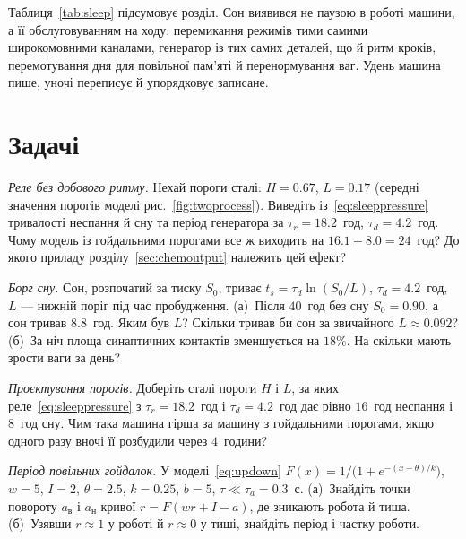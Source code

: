 Таблиця~\ref{tab:sleep} підсумовує розділ. Сон виявився не паузою в роботі машини, а її обслуговуванням на ходу: перемикання режимів тими самими широкомовними каналами, генератор із тих самих деталей, що й ритм кроків, перемотування дня для повільної пам'яті й перенормування ваг. Удень машина пише, уночі переписує й упорядковує записане.

\section{Задачі}

\begin{exercise}[\lvlA]
\label{ex:20:1}
\emph{Реле без добового ритму.} Нехай пороги сталі: $H=0.67$, $L=0.17$ (середні значення порогів моделі рис.~\ref{fig:twoprocess}). Виведіть із~\eqref{eq:sleeppressure} тривалості неспання й сну та період генератора за $\tau_r=18.2$~год, $\tau_d=4.2$~год. Чому модель із гойдальними порогами все ж виходить на $16.1+8.0=24$~год? До якого приладу розділу~\ref{sec:chemoutput} належить цей ефект?
\end{exercise}

\begin{exercise}[\lvlA]
\label{ex:20:2}
\emph{Борг сну.} Сон, розпочатий за тиску $S_0$, триває $t_s=\tau_d\ln(S_0/L)$, $\tau_d=4.2$~год, $L$ --- нижній поріг під час пробудження. (а)~Після $40$~год без сну $S_0=0.90$, а сон тривав $8.8$~год. Яким був $L$? Скільки тривав би сон за звичайного $L\approx0.092$? (б)~За ніч площа синаптичних контактів зменшується на $18\%$. На скільки мають зрости ваги за день?
\end{exercise}

\begin{exercise}[\lvlB]
\label{ex:20:3}
\emph{Проєктування порогів.} Доберіть сталі пороги $H$ і $L$, за яких реле~\eqref{eq:sleeppressure} з $\tau_r=18.2$~год і $\tau_d=4.2$~год дає рівно $16$~год неспання і $8$~год сну. Чим така машина гірша за машину з гойдальними порогами, якщо одного разу вночі її розбудили через $4$~години?
\end{exercise}

\begin{exercise}[\lvlB]
\label{ex:20:4}
\emph{Період повільних гойдалок.} У моделі~\eqref{eq:updown} $F(x)=1/\bigl(1+e^{-(x-\theta)/k}\bigr)$, $w=5$, $I=2$, $\theta=2.5$, $k=0.25$, $b=5$, $\tau\ll\tau_a=0.3$~с. (а)~Знайдіть точки повороту $a_{\text{в}}$ і $a_{\text{н}}$ кривої $r=F(wr+I-a)$, де зникають робота й тиша. (б)~Узявши $r\approx1$ у роботі й $r\approx0$ у тиші, знайдіть період і частку роботи.
\end{exercise}

